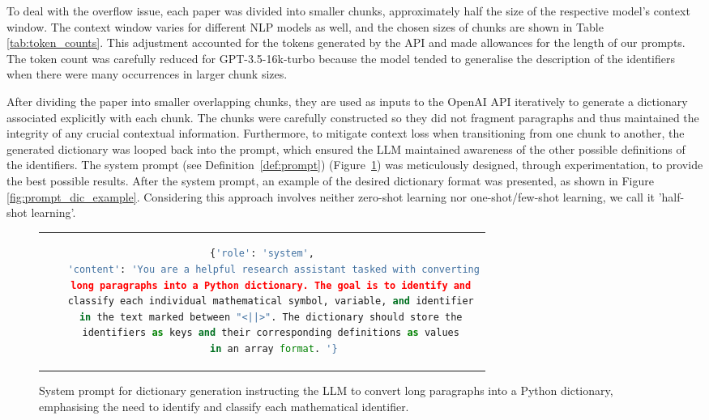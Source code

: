 To deal with the overflow issue, each paper was divided into smaller chunks, approximately half the size of the respective model's context window. The context window varies for different \ac{NLP} models as well, and the chosen sizes of chunks are shown in Table \ref{tab:token_counts}. This adjustment accounted for the tokens generated by the API and made allowances for the length of our prompts. The token count was carefully reduced for GPT-3.5-16k-turbo because the model tended to generalise the description of the identifiers when there were many occurrences in larger chunk sizes.

After dividing the paper into smaller overlapping chunks, they are used as inputs to the OpenAI API iteratively to generate a dictionary associated explicitly with each chunk. The chunks were carefully constructed so they did not fragment paragraphs and thus maintained the integrity of any crucial contextual information. Furthermore, to mitigate context loss when transitioning from one chunk to another, the generated dictionary was looped back into the prompt, which ensured the LLM maintained awareness of the other possible definitions of the identifiers. The system prompt (see Definition~\ref{def:prompt}) (Figure~\ref{fig:prompt_dic_system}) was meticulously designed, through experimentation, to provide the best possible results. After the system prompt, an example of the desired dictionary format was presented, as shown in Figure \ref{fig:prompt_dic_example}. Considering this approach involves neither zero-shot learning nor one-shot/few-shot learning, we call it  'half-shot learning'. 

\begin{figure}[htpb]
  \centering
  \begin{tabular}{c}
  \begin{lstlisting}[language=python]
    {'role': 'system',
    'content': 'You are a helpful research assistant tasked with converting
    long paragraphs into a Python dictionary. The goal is to identify and 
    classify each individual mathematical symbol, variable, and identifier 
    in the text marked between "<||>". The dictionary should store the 
    identifiers as keys and their corresponding definitions as values 
    in an array format. '}
  \end{lstlisting}
  \end{tabular}
  \caption[System Prompt for Dictionary Generation]{System prompt for dictionary generation instructing the LLM to convert long paragraphs into a Python dictionary, emphasising the need to identify and classify each mathematical identifier.}\label{fig:prompt_dic_system}
\end{figure}

